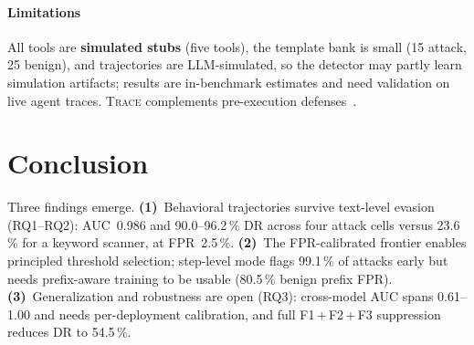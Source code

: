\documentclass[conference]{IEEEtran}
\begin{document}
\paragraph{Limitations}
All tools are \textbf{simulated stubs} (five tools), the template bank
is small (15 attack, 25 benign), and trajectories are LLM-simulated, so
the detector may partly learn simulation artifacts; results are
in-benchmark estimates and need validation on live agent traces.
\textsc{Trace} complements pre-execution
defenses~\cite{hines2024spotlighting,inan2023llama}.

\section{Conclusion}
\label{sec:conclusion}

Three findings emerge.
\textbf{(1)}~Behavioral trajectories survive text-level evasion
(RQ1--RQ2): AUC~0.986 and 90.0--96.2\,\% DR across four attack cells
versus 23.6\,\% for a keyword scanner, at FPR~2.5\,\%.
\textbf{(2)}~The FPR-calibrated frontier enables principled threshold
selection; step-level mode flags 99.1\,\% of attacks early but needs
prefix-aware training to be usable (80.5\,\% benign prefix FPR).
\textbf{(3)}~Generalization and robustness are open (RQ3): cross-model
AUC spans 0.61--1.00 and needs per-deployment calibration, and full
F1\,+\,F2\,+\,F3 suppression reduces DR to 54.5\,\%.




\end{document}
